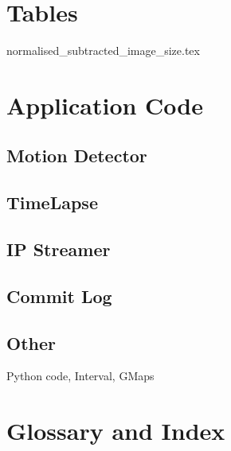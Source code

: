 \documentclass[11pt]{article} %
\begin{document}
\section{Tables}
{normalised_subtracted_image_size.tex}


\section{Application Code}
\subsection{Motion Detector}
\subsection{TimeLapse}
\subsection{IP Streamer}
\subsection{Commit Log}
\subsection{Other}{Python code, Interval, GMaps}

\section{Glossary and Index}
\end{document}
